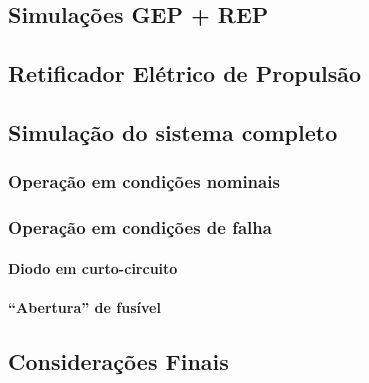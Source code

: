 
%


\begin{braziltext}

    \chapter[Simulações]{Simulações GEP + REP}


    \section{Retificador Elétrico de Propulsão}


    \section{Simulação do sistema completo}


    \subsection{Operação em condições nominais}


    \subsection{Operação em condições de falha}


    \subsubsection{Diodo em curto-circuito}


    \subsubsection{``Abertura'' de fusível}


    \section{Considerações Finais}

\end{braziltext}


